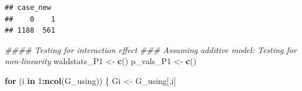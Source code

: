 \documentclass[
]{article}
\newenvironment{Shaded}{\begin{snugshade}}{\end{snugshade}}
\newcommand{\CommentTok}[1]{\textcolor[rgb]{0.56,0.35,0.01}{\textit{#1}}}
\newcommand{\ControlFlowTok}[1]{\textcolor[rgb]{0.13,0.29,0.53}{\textbf{#1}}}
\newcommand{\DecValTok}[1]{\textcolor[rgb]{0.00,0.00,0.81}{#1}}
\newcommand{\KeywordTok}[1]{\textcolor[rgb]{0.13,0.29,0.53}{\textbf{#1}}}
\newcommand{\NormalTok}[1]{#1}
\newcommand{\OperatorTok}[1]{\textcolor[rgb]{0.81,0.36,0.00}{\textbf{#1}}}
\newcommand{\StringTok}[1]{\textcolor[rgb]{0.31,0.60,0.02}{#1}}
\begin{document}
\begin{Shaded}
\begin{Highlighting}[]
{{\CommentTok{### case_control ratio: }
\KeywordTok{table}\NormalTok{(case_new)}
\end{Highlighting}
\end{Shaded}

\begin{verbatim}
## case_new
##    0    1 
## 1188  561
\end{verbatim}

\begin{Shaded}
\begin{Highlighting}[]
\CommentTok{#### Testing for interaction effect}
\CommentTok{### Assuming additive model: Testing for non-linearity}
\NormalTok{waldstats_P1 <-}\StringTok{ }\KeywordTok{c}\NormalTok{()}
\NormalTok{p_vals_P1 <-}\StringTok{ }\KeywordTok{c}\NormalTok{()}

\ControlFlowTok{for}\NormalTok{ (i }\ControlFlowTok{in} \DecValTok{1}\OperatorTok{:}\KeywordTok{ncol}\NormalTok{(G_using)) \{}
\NormalTok{  Gi <-}\StringTok{ }\NormalTok{G_using[,i]}
  

\end{Highlighting}
\end{Shaded}
\end{document}
